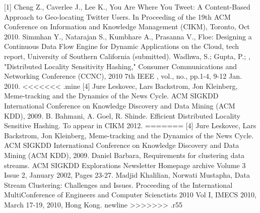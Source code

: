 \documentclass{article} %
\begin{document}
\small{

[1] 	Cheng Z., Caverlee J., Lee K., You Are Where You Tweet: A Content-Based Approach to Geo-locating Twitter Users. In Proceeding of the 19th ACM Conference on Information and Knowledge Management (CIKM), Toronto, Oct 2010. \newline
[2] Simmhan Y., Natarajan S., Kumbhare A., Prasanna V., Floe: Designing a Continuous Data Flow Engine for Dynamic Applications on the Cloud, tech report, University of Southern California (submitted). \newline
[3] Wadhwa, S.; Gupta, P.; , "Distributed Locality Sensitivity Hashing," Consumer Communications and Networking Conference (CCNC), 2010 7th IEEE , vol., no., pp.1-4, 9-12 Jan. 2010. \newline
<<<<<<< .mine
[4] Jure Leskovec, Lars Backstrom, Jon Kleinberg, Meme-tracking and the Dynamics of the News Cycle. ACM SIGKDD International Conference on Knowledge Discovery and Data Mining (ACM KDD), 2009. \newline
[5] B. Bahmani, A. Goel, R. Shinde. Efficient Distributed Locality Sensitive Hashing. To appear in CIKM 2012.
=======
[4] Jure Leskovec, Lars Backstrom, Jon Kleinberg, Meme-tracking and the Dynamics of the News Cycle. ACM SIGKDD International Conference on Knowledge Discovery and Data Mining (ACM KDD), 2009. \newline
[5] Daniel Barbara, Requirements for clustering data streams. ACM SIGKDD Explorations Newsletter Homepage archive
Volume 3 Issue 2, January 2002, Pages 23-27. \newline
[6] Madjid Khalilian, Norwati Mustapha, Data Stream Clustering: Challenges and Issues. Proceeding of the International MultiConference of Engineers and Computer Scienctists 2010 Vol I, IMECS 2010, March 17-19, 2010, Hong Kong. newline
>>>>>>> .r55
}
\end{document}

